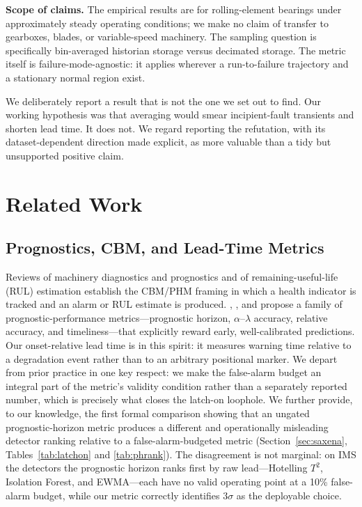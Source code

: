\documentclass[IJPHM, 2026, 0]{PHMSociety}
\begin{document}
\textbf{Scope of claims.} The empirical results are for rolling-element bearings under approximately steady operating conditions; we make no claim of transfer to gearboxes, blades, or variable-speed machinery. The sampling question is specifically bin-averaged historian storage versus decimated storage. The metric itself is failure-mode-agnostic: it applies wherever a run-to-failure trajectory and a stationary normal region exist.

We deliberately report a result that is not the one we set out to find. Our working hypothesis was that averaging would smear incipient-fault transients and shorten lead time. It does not. We regard reporting the refutation, with its dataset-dependent direction made explicit, as more valuable than a tidy but unsupported positive claim.


\section{Related Work}

\subsection{Prognostics, CBM, and Lead-Time Metrics}
Reviews of machinery diagnostics and prognostics \cite{jardine2006review,lee2014prognostics,lei2018machinery} and of remaining-useful-life (RUL) estimation \cite{si2011remaining} establish the CBM/PHM framing in which a health indicator is tracked and an alarm or RUL estimate is produced. , , and  propose a family of prognostic-performance metrics---prognostic horizon, $\alpha$--$\lambda$ accuracy, relative accuracy, and timeliness---that explicitly reward early, well-calibrated predictions. Our onset-relative lead time is in this spirit: it measures warning time relative to a degradation event rather than to an arbitrary positional marker. We depart from prior practice in one key respect: we make the false-alarm budget an integral part of the metric's validity condition rather than a separately reported number, which is precisely what closes the latch-on loophole. We further provide, to our knowledge, the first formal comparison showing that an ungated prognostic-horizon metric produces a different and operationally misleading detector ranking relative to a false-alarm-budgeted metric (Section~\ref{sec:saxena}, Tables~\ref{tab:latchon} and \ref{tab:phrank}). The disagreement is not marginal: on IMS the detectors the prognostic horizon ranks first by raw lead---Hotelling $T^2$, Isolation Forest, and EWMA---each have no valid operating point at a 10\% false-alarm budget, while our metric correctly identifies $3\sigma$ as the deployable choice.
\end{document}
